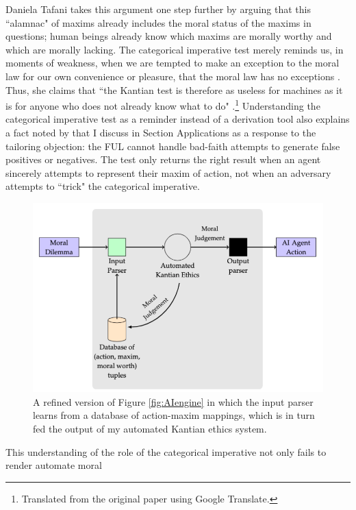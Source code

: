 \begin{isabellebody}
\begin{isamarkuptext}
Daniela Tafani takes this argument one step further by arguing that this ``alamnac" of maxims already 
includes the moral status of the maxims in questions; human beings already
know which maxims are morally worthy and which are morally lacking. The categorical imperative test
merely reminds us, in moments of weakness, when we are tempted to make an exception to the moral law for 
our own convenience or pleasure, that the moral law has no exceptions \citep[9]{tafani}. Thus, she claims
that ``the Kantian test is therefore as useless for machines as it is for anyone who does
not already know what to do" \citep[8]{tafani}.\footnote{Translated from the original paper using Google Translate.} 
Understanding the categorical imperative test as a reminder
instead of a derivation tool also explains a fact noted by \cite{constofreason} that I discuss in Section Applications as a 
response to the tailoring objection: the FUL cannot handle bad-faith attempts to generate false
positives or negatives. The test only returns the right result when an agent sincerely attempts to 
represent their maxim of action, not when an adversary attempts to ``trick" the categorical imperative.%
\end{isamarkuptext}\isamarkuptrue%
%
\begin{figure}
\centering
\includegraphics[scale=0.5]{inputparser.png}
\caption{A refined version of Figure \ref{fig:AIengine} in which the input parser learns from a database
of action-maxim mappings, which is in turn fed the output of my automated Kantian ethics system. } \label{fig:inputparser}
\end{figure}
%
\begin{isamarkuptext}%
This understanding of the role of the categorical imperative not only fails to render automate moral

\end{isamarkuptext}
\end{isabellebody}
